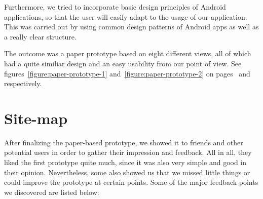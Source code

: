 \documentclass[11pt,twoside,a4paper]{report}
\begin{document}
Furthermore, we tried to incorporate basic design principles of Android applications, so that the user will easily adapt to the usage of our application. This was carried out by using common design patterns of Android apps as well as a really clear structure.

The outcome was a paper prototype based on eight different views, all of which had a quite similiar design and an easy usability from our point of view. See figures~\ref{figure:paper-prototype-1} and~\ref{figure:paper-prototype-2} on pages~\pageref{figure:paper-prototype-1} and~\pageref{figure:paper-prototype-2} respectively.

\section{Site-map}

After finalizing the paper-based prototype, we showed it to friends and other potential users in order to gather their impression and feedback. All in all, they liked the first prototype quite much, since it was also very simple and good in their opinion. Nevertheless, some also showed us that we missed little things or could improve the prototype at certain points. Some of the major feedback points we discovered are listed below:
\end{document}
